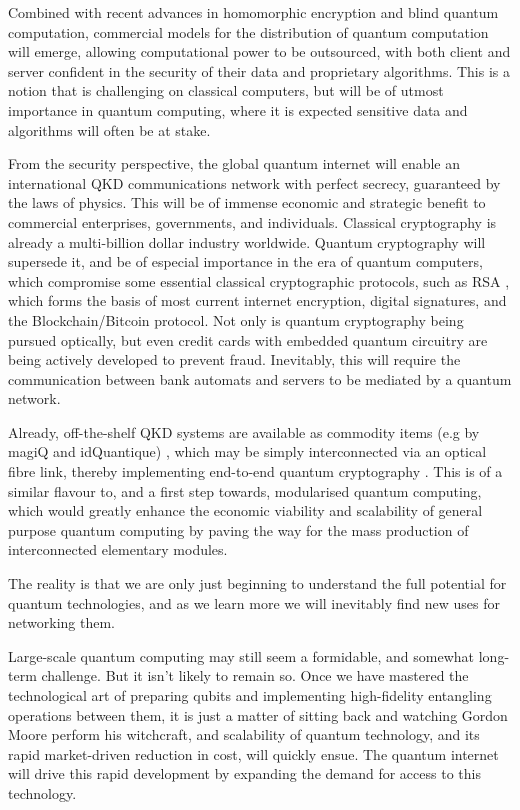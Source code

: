 \documentclass[aps,rmp,twocolumn,amsmath,amssymb,nofootinbib,superscriptaddress]{revtex4}
\newcommand{\comment}[1]{{\color{blue}{\textbf{#1}}}}
\begin{document}
Combined with recent advances in homomorphic encryption and blind quantum computation, commercial models for the distribution of quantum computation will emerge, allowing computational power to be outsourced, with both client and server confident in the security of their data and proprietary algorithms. This is a notion that is challenging on classical computers, but will be of utmost importance in quantum computing, where it is expected sensitive data and algorithms will often be at stake.

From the security perspective, the global quantum internet will enable an international QKD communications network with perfect secrecy, guaranteed by the laws of physics. This will be of immense economic and strategic benefit to commercial enterprises, governments, and individuals. Classical cryptography is already a multi-billion dollar industry worldwide. Quantum cryptography will supersede it, and be of especial importance in the era of quantum computers, which compromise some essential classical cryptographic protocols, such as RSA \cite{bib:RSA}, which forms the basis of most current internet encryption, digital signatures, and the Blockchain/Bitcoin protocol. Not only is quantum cryptography being pursued optically, but even credit cards with embedded quantum circuitry are being actively developed to prevent fraud. Inevitably, this will require the communication between bank automats and servers to be mediated by a quantum network.

Already, off-the-shelf QKD systems are available as commodity items (e.g by magiQ and idQuantique) \comment{Check this. Are there others?}, which may be simply interconnected via an optical fibre link, thereby implementing end-to-end quantum cryptography \cite{???, IDQUANTIQUE, MAGICQ}. This is of a similar flavour to, and a first step towards, modularised quantum computing, which would greatly enhance the economic viability and scalability of general purpose quantum computing by paving the way for the mass production of interconnected elementary modules.

The reality is that we are only just beginning to understand the full potential for quantum technologies, and as we learn more we will inevitably find new uses for networking them.

Large-scale quantum computing may still seem a formidable, and somewhat long-term challenge. But it isn't likely to remain so. Once we have mastered the technological art of preparing qubits and implementing high-fidelity entangling operations between them, it is just a matter of sitting back and watching Gordon Moore perform his witchcraft, and scalability of quantum technology, and its rapid market-driven reduction in cost, will quickly ensue. The quantum internet will drive this rapid development by expanding the demand for access to this technology.
\end{document}
